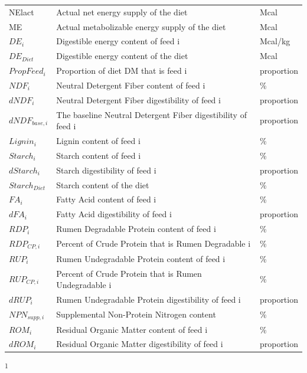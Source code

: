 \begin{refsection}
\begin{longtable}{@{} L{3.5cm} L{5.5cm} L{3.5cm} @{}}
NElact & Actual net energy supply of the diet& Mcal\\
ME & Actual metabolizable energy supply of the diet& Mcal\\
$DE_{i}$ & Digestible energy content of feed i & Mcal/kg\\
$DE_{Diet}$ & Digestible energy content of the diet & Mcal\\
$PropFeed_{i}$ & Proportion of diet DM that is feed i & proportion\\
$NDF_{i}$ & Neutral Detergent Fiber content of feed i & \% \\
$dNDF_{i}$ & Neutral Detergent Fiber digestibility of feed i & proportion\\
$dNDF_{base,i}$ & The baseline Neutral Detergent Fiber digestibility of feed i & proportion\\
$Lignin_{i}$ & Lignin content of feed i & \% \\
$Starch_{i}$ & Starch content of feed i & \% \\
$dStarch_{i}$ & Starch digestibility of feed i & proportion\\
$Starch_{Diet}$ & Starch content of the diet & \% \\
$FA_{i}$ & Fatty Acid content of feed i & \% \\
$dFA_{i}$ & Fatty Acid digestibility of feed i & proportion\\
$RDP_{i}$ & Rumen Degradable Protein content of feed i & \% \\
$RDP_{CP,i}$ & Percent of Crude Protein that is Rumen Degradable i & \% \\
$RUP_{i}$ & Rumen Undegradable Protein content of feed i & \%\\
$RUP_{CP,i}$ & Percent of Crude Protein that is Rumen Undegradable i & \% \\
$dRUP_{i}$ & Rumen Undegradable Protein digestibility of feed i & proportion\\
$NPN_{supp,i}$ & Supplemental Non-Protein Nitrogen content & \%\\
$ROM_{i}$ & Residual Organic Matter content of feed i & \% \\
$dROM_{i}$ & Residual Organic Matter digestibility of feed i & proportion\\

    \end{longtable}

{\textsuperscript{1} \cite{nrc2021}} 

\vspace{0.25cm}


\end{refsection}
